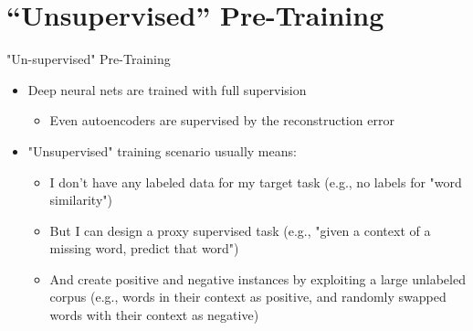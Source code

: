 \documentclass[12pt,aspectratio=169,handout]{beamer}
\begin{document}
\section{``Unsupervised'' Pre-Training}

\begin{frame}{"Un-supervised" Pre-Training}
	
	\begin{itemize}
		\item Deep neural nets are trained with full supervision
		\begin{itemize}
			\item Even autoencoders are supervised by the reconstruction error
		\end{itemize}
		\item "Unsupervised" training scenario usually means:
		\begin{itemize}
			\item 	I don't have any labeled data for my target task (e.g., no labels for "word similarity")
			\item 	But I can design a proxy supervised task (e.g., "given a context of a missing word, predict that word")
			\item	And create positive and negative instances by exploiting a large unlabeled corpus (e.g., words in their context as positive, and randomly swapped words with their context as negative)
		\end{itemize}
	\end{itemize}
	
	
\end{frame}
\end{document}
